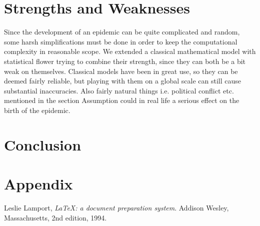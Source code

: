 \documentclass[12pt]{article}
\begin{document}
\newpage
\section{Strengths and Weaknesses}

Since the development of an epidemic can be quite complicated and random, some harsh simplifications must be done in order to keep the computational complexity in reasonable scope. We extended a classical mathematical model with statistical flower trying to combine their strength, since they can both be a bit weak on themselves. Classical models have been in great use, so they can be deemed fairly reliable, but playing with them on a global scale can still cause substantial inaccuracies. Also fairly natural things i.e. political conflict etc. mentioned in the section Assumption could in real life a serious effect on the birth of the epidemic.

\newpage
\section{Conclusion}

\newpage
\section{Appendix}

\newpage

\begin{thebibliography}{9}

  Leslie Lamport,
  \emph{\LaTeX: a document preparation system}.
  Addison Wesley, Massachusetts,
  2nd edition,
  1994.

\end{thebibliography}
\end{document}
